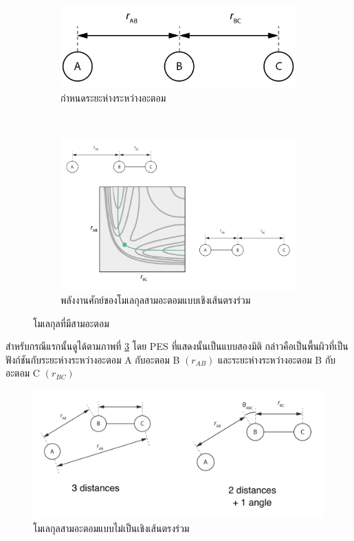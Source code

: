 \begin{figure}[H]
    \centering
    \begin{subfigure}{0.5\textwidth}
        \centering
        \includegraphics[width=\linewidth]{fig/3-body_collinear.png}
        \caption{กำหนดระยะห่างระหว่างอะตอม}
        \label{fig:3_body_mol}
    \end{subfigure}%
    \\
    \begin{subfigure}{0.9\textwidth}
        \centering
        \includegraphics[width=\linewidth]{fig/3-body_collinear_PES.png}
        \caption{พลังงานศักย์ของโมเลกุลสามอะตอมแบบเชิงเส้นตรงร่วม}
        \label{fig:PES_3_body_mol}
    \end{subfigure}
    \caption{โมเลกุลที่มีสามอะตอม}
    \label{fig:3_body_mol_and_PES}
\end{figure}

สำหรับกรณีแรกนั้นดูได้ตามภาพที่ \ref{fig:3_body_mol_and_PES} โดย PES ที่แสดงนั้นเป็นแบบสองมิติ กล่าวคือเป็นพื้นผิวที่เป็นฟังก์ชันกับระยะห่างระหว่างอะตอม A กับอะตอม B $(r_{AB})$ และระยะห่างระหว่างอะตอม B กับอะตอม C $(r_{BC})$

\begin{figure}[H]
    \centering
    \includegraphics[width=0.8\linewidth]{fig/3-body_non-collinear.png}
    \caption{โมเลกุลสามอะตอมแบบไม่เป็นเชิงเส้นตรงร่วม}
    \label{fig:non_collinear}
\end{figure}

